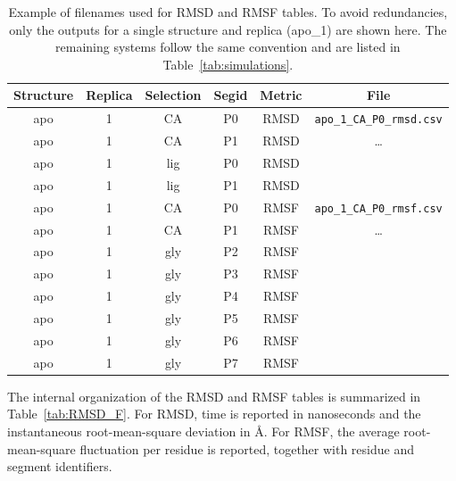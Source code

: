 \documentclass{article}
\begin{document}
\begin{table}[h]
    \centering
    \begin{tabular}{cccccc}
    \toprule
      Structure & Replica & Selection & Segid & Metric  & File \\
      \midrule
         apo    &  1      & CA        & P0    & RMSD & \verb+apo_1_CA_P0_rmsd.csv+\\
         apo    &  1      & CA        & P1    & RMSD & \dots \\
        
         apo    &  1      & lig       & P0    & RMSD & \\
         apo    &  1      & lig       & P1    & RMSD & \\
        \midrule
         apo    &  1      & CA        & P0    &  RMSF & \verb+apo_1_CA_P0_rmsf.csv+ \\
         apo    &  1      & CA        & P1    &  RMSF & \dots \\
         apo    &  1      & gly       & P2    &  RMSF & \\
         apo    &  1      & gly       & P3    &  RMSF & \\
         apo    &  1      & gly       & P4    &  RMSF & \\
         apo    &  1      & gly       & P5    &  RMSF & \\
         apo    &  1      & gly       & P6    &  RMSF & \\
         apo    &  1      & gly       & P7    &  RMSF & \\
    \bottomrule  
    \end{tabular}
    \caption{Example of filenames used for RMSD and RMSF tables.
    To avoid redundancies, only the outputs for a single structure and replica (apo\_1) are shown here.
    The remaining systems follow the same convention and are listed in Table~\ref{tab:simulations}.}
    \label{tab:tables}
\end{table}

The internal organization of the RMSD and RMSF tables is summarized in Table~\ref{tab:RMSD_F}.
For RMSD, time is reported in nanoseconds and the instantaneous root-mean-square deviation in \AA.
For RMSF, the average root-mean-square fluctuation per residue is reported, together with residue and segment identifiers.
\end{document}
